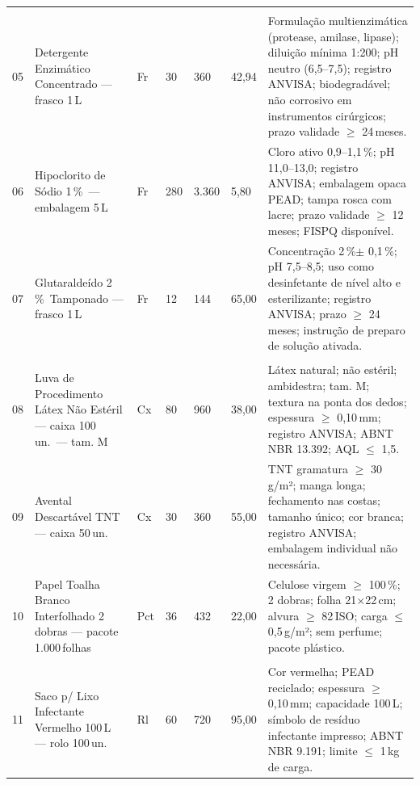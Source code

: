 \documentclass[12pt,a4paper]{article}
\newcommand{\pct}{\%}
\begin{document}
\begin{landscape}
\begin{longtable}{C{0.5cm} L{4.2cm} C{1.0cm} C{1.5cm} C{1.8cm} C{2.2cm} L{5.5cm}}
 \\
05 & Detergente Enzimático Concentrado --- frasco 1\,L &
Fr & 30 & 360 & 42,94 &
Formulação multienzimática (protease, amilase, lipase); diluição mínima 1:200; pH neutro (6,5--7,5); registro ANVISA; biodegradável; não corrosivo em instrumentos cirúrgicos; prazo validade $\geq$ 24\,meses. \\

06 & Hipoclorito de Sódio 1\,\pct\ --- embalagem 5\,L &
Fr & 280 & 3.360 & 5,80 &
Cloro ativo 0,9--1,1\,\pct; pH 11,0--13,0; registro ANVISA; embalagem opaca PEAD; tampa rosca com lacre; prazo validade $\geq$ 12\,meses; FISPQ disponível. \\

07 & Glutaraldeído 2\,\pct\ Tamponado --- frasco 1\,L &
Fr & 12 & 144 & 65,00 &
Concentração 2\,\pct $\pm$ 0,1\,\pct; pH 7,5--8,5; uso como desinfetante de nível alto e esterilizante; registro ANVISA; prazo $\geq$ 24\,meses; instrução de preparo de solução ativada. \\

 \\
08 & Luva de Procedimento Látex Não Estéril --- caixa 100\,un.\ --- tam. M &
Cx & 80 & 960 & 38,00 &
Látex natural; não estéril; ambidestra; tam. M; textura na ponta dos dedos; espessura $\geq$ 0,10\,mm; registro ANVISA; ABNT NBR 13.392; AQL $\leq$ 1,5. \\

09 & Avental Descartável TNT --- caixa 50\,un. &
Cx & 30 & 360 & 55,00 &
TNT gramatura $\geq$ 30\,g/m²; manga longa; fechamento nas costas; tamanho único; cor branca; registro ANVISA; embalagem individual não necessária. \\

10 & Papel Toalha Branco Interfolhado 2 dobras --- pacote 1.000\,folhas &
Pct & 36 & 432 & 22,00 &
Celulose virgem $\geq$ 100\,\pct; 2 dobras; folha 21$\times$22\,cm; alvura $\geq$ 82\,ISO; carga $\leq$ 0,5\,g/m²; sem perfume; pacote plástico. \\

 \\
11 & Saco p/ Lixo Infectante Vermelho 100\,L --- rolo 100\,un. &
Rl & 60 & 720 & 95,00 &
Cor vermelha; PEAD reciclado; espessura $\geq$ 0,10\,mm; capacidade 100\,L; símbolo de resíduo infectante impresso; ABNT NBR 9.191; limite $\leq$ 1\,kg de carga. \\


\end{longtable}
\end{landscape}
\end{document}
